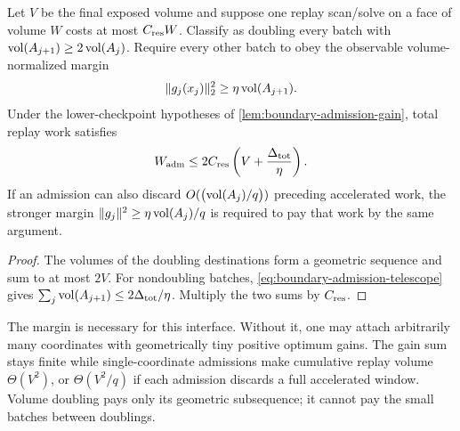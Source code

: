\begin{corollary}
\label{cor:conditional-admission-work}
Let $V$ be the final exposed volume and suppose one replay scan/solve on a
face of volume $W$ costs at most $C_{\rm res}W$.  Classify as doubling every
batch with $\operatorname{vol}(A_{j+1})\geq2\operatorname{vol}(A_j)$.  Require every other batch to obey
the observable volume-normalized margin
\begin{equation*}
 \lVert g_j(x_j)\rVert_2^2\geq\eta\operatorname{vol}(A_{j+1}).
\end{equation*}
Under the lower-checkpoint hypotheses of
\cref{lem:boundary-admission-gain}, total replay work satisfies
\begin{equation}
 W_{\rm adm}
 \leq2C_{\rm res}\left(V+\frac{\Delta_{\rm tot}}\eta\right).
 \label{eq:conditional-admission-work}
\end{equation}
If an admission can also discard $O(\bigl(\operatorname{vol}(A_j)/q\bigr))$ preceding
accelerated work, the stronger margin
$\lVert g_j\rVert^2\geq\eta\operatorname{vol}(A_j)/q$ is required to pay that work by the same
argument.
\end{corollary}

\begin{proof}
The volumes of the doubling destinations form a geometric sequence and sum
to at most $2V$.  For nondoubling batches,
\cref{eq:boundary-admission-telescope} gives
$\sum_j\operatorname{vol}(A_{j+1})\leq2\Delta_{\rm tot}/\eta$.  Multiply the two sums by
$C_{\rm res}$.
\end{proof}

The margin is necessary for this interface.  Without it, one may attach
arbitrarily many coordinates with geometrically tiny positive optimum gains.
The gain sum stays finite while single-coordinate admissions make cumulative
replay volume $\Theta(V^2)$, or $\Theta(V^2/q)$ if each admission discards a
full accelerated window.  Volume doubling pays only its geometric
subsequence; it cannot pay the small batches between doublings.
